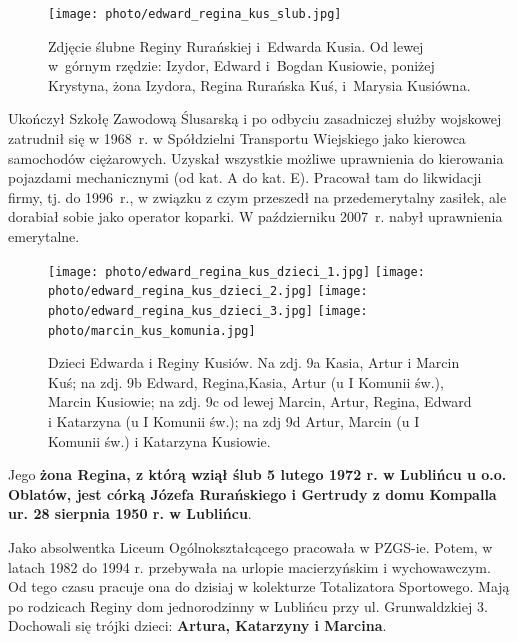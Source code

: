 \begin{figure}[!h]
\begin{center}
\texttt{[image: photo/edward\_regina\_kus\_slub.jpg]}
\caption[Zdjęcie ślubne Reginy Rurańskiej i Edwarda Kusia]{Zdjęcie ślubne Reginy Rurańskiej i~Edwarda Kusia. Od lewej w~górnym rzędzie: Izydor, Edward i~Bogdan Kusiowie, poniżej Krystyna, żona Izydora, Regina Rurańska Kuś, i~Marysia Kusiówna.}
\label{rys:edward_regina_kus_slub}
\end{center}
\end{figure}

Ukończył Szkołę Zawodową Ślusarską i po odbyciu zasadniczej służby wojskowej zatrudnił się w 1968~r. w Spółdzielni Transportu Wiejskiego jako kierowca samochodów ciężarowych. Uzyskał wszystkie możliwe uprawnienia do kierowania pojazdami mechanicznymi (od kat. A do kat. E). Pracował tam do likwidacji firmy, tj. do 1996~r., w związku z czym przeszedł na przedemerytalny zasiłek, ale dorabiał sobie jako operator koparki. W październiku 2007~r. nabył uprawnienia emerytalne.

\begin{figure}[!h]
\begin{center}
\texttt{[image: photo/edward\_regina\_kus\_dzieci\_1.jpg]}
\texttt{[image: photo/edward\_regina\_kus\_dzieci\_2.jpg]}
\texttt{[image: photo/edward\_regina\_kus\_dzieci\_3.jpg]}
\texttt{[image: photo/marcin\_kus\_komunia.jpg]}
\caption[Dzieci Edwarda i Reginy Kusiów]{Dzieci Edwarda i Reginy Kusiów. Na zdj. 9a Kasia, Artur i Marcin Kuś; na zdj. 9b Edward, Regina,Kasia, Artur (u I Komunii św.), Marcin Kusiowie; na zdj. 9c od lewej Marcin, Artur, Regina, Edward i Katarzyna (u I Komunii św.); na zdj 9d Artur, Marcin (u I Komunii św.) i Katarzyna Kusiowie. }
\label{rys:edward_regina_kus_dzieci_1}
\end{center}
\end{figure}



Jego \textbf{żona Regina, z którą wziął ślub 5 lutego 1972 r. w Lublińcu u o.o. Oblatów, jest córką Józefa Rurańskiego i Gertrudy z domu Kompalla ur. 28 sierpnia 1950 r. w Lublińcu}.

Jako absolwentka Liceum Ogólnokształcącego pracowała w PZGS-ie. Potem, w latach 1982 do 1994 r. przebywała na urlopie macierzyńskim i wychowawczym. Od tego czasu pracuje ona do dzisiaj w kolekturze Totalizatora Sportowego. Mają po rodzicach Reginy dom jednorodzinny w Lublińcu przy ul. Grunwaldzkiej 3. Dochowali się trójki dzieci: \textbf{Artura, Katarzyny i Marcina}.


